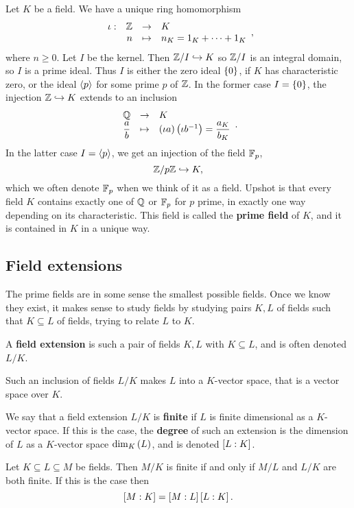 Let $ K $ be a field. We have a unique ring homomorphism
$$ \function[\iota]{\Z}{K}{n}{n_K = 1_K + \dots + 1_K}, $$
where $ n \ge 0 $. Let $ I $ be the kernel. Then $ \Z / I \hookrightarrow K $ so $ \Z / I $ is an integral domain, so $ I $ is a prime ideal. Thus $ I $ is either the zero ideal $ \cb{0} $, if $ K $ has characteristic zero, or the ideal $ \ab{p} $ for some prime $ p $ of $ \Z $. In the former case $ I = \cb{0} $, the injection $ \Z \hookrightarrow K $ extends to an inclusion
$$ \function{\Q}{K}{\dfrac{a}{b}}{\rb{\iota a}\rb{\iota b^{-1}} = \dfrac{a_K}{b_K}}. $$
In the latter case $ I = \ab{p} $, we get an injection of the field $ \F_p $,
$$ \Z / p\Z \hookrightarrow K, $$
which we often denote $ \F_p $ when we think of it as a field. Upshot is that every field $ K $ contains exactly one of $ \Q $ or $ \F_p $ for $ p $ prime, in exactly one way depending on its characteristic. This field is called the \textbf{prime field} of $ K $, and it is contained in $ K $ in a unique way.

\subsection{Field extensions}

The prime fields are in some sense the smallest possible fields. Once we know they exist, it makes sense to study fields by studying pairs $ K, L $ of fields such that $ K \subseteq L $ of fields, trying to relate $ L $ to $ K $.

\begin{definition}
A \textbf{field extension} is such a pair of fields $ K, L $ with $ K \subseteq L $, and is often denoted $ L / K $.
\end{definition}

\begin{note*}
Such an inclusion of fields $ L / K $ makes $ L $ into a $ K $-vector space, that is a vector space over $ K $.
\end{note*}

\begin{definition}
We say that a field extension $ L / K $ is \textbf{finite} if $ L $ is finite dimensional as a $ K $-vector space. If this is the case, the \textbf{degree} of such an extension is the dimension of $ L $ as a $ K $-vector space $ \dim_K\rb{L} $, and is denoted $ \sb{L : K} $.
\end{definition}

\begin{proposition}
Let $ K \subseteq L \subseteq M $ be fields. Then $ M / K $ is finite if and only if $ M / L $ and $ L / K $ are both finite. If this is the case then
$$ \sb{M : K} = \sb{M : L}\sb{L : K}. $$
\end{proposition}


